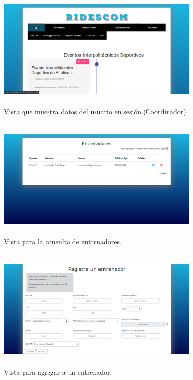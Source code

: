 		\begin{figure} [hbt!]
			\centering
			\includegraphics[width=10cm, height=6cm]{Imagenes/Vistas/Vista14_MenuUsuarioCoord}
			\caption{Vista que muestra datos del usuario en sesión.(Coordinador)}
			\label{VistaMenuCoord}
		\end{figure}
		
		\begin{figure} [hbt!]
			\centering
			\includegraphics[width=10cm, height=6cm]{Imagenes/Vistas/Vista15_ConsultaEntrenador}
			\caption{Vista para la consulta de entrenadores.}
			\label{VistaConsultaEntrenador}
		\end{figure}
		
		\begin{figure} [hbt!]
			\centering
			\includegraphics[width=10cm, height=6cm]{Imagenes/Vistas/Vista16_AgregaEntrenador}
			\caption{Vista para agregar a un entrenador.}
			\label{VistaAgregarEntrenador}
		\end{figure}
	
